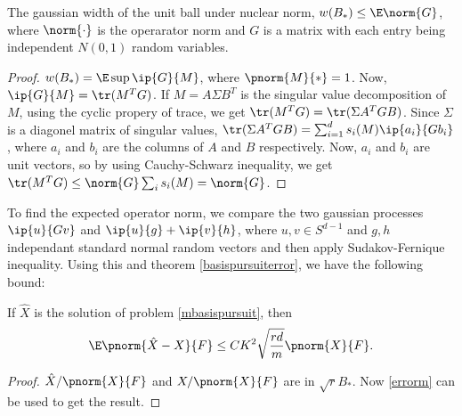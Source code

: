 \begin{proposition}
	The gaussian width of the unit ball under nuclear norm,
	$w(B_*) \leq \E \norm{G}$, where $\norm{\cdot}$ is the operarator norm
	and $G$ is a matrix with each entry being independent $N(0, 1)$
	random variables.
\end{proposition}
\begin{proof}
	$w(B_*) = \E\sup\ip{G}{M}$, where $\pnorm{M}{*} = 1$.
	Now, $\ip{G}{M} = \tr(M^TG)$. If $M = A\Sigma B^T$ is the
	singular value decomposition of $M$, using the cyclic propery
	of trace, we get $\tr(M^TG) = \tr(\Sigma A^T G B)$. Since
	$\Sigma$ is a diagonel matrix of singular values,
	$\tr(\Sigma A^T G B) = \sum_{i=1}^d s_i(M)\ip{a_i}{Gb_i}$,
	where $a_i$ and $b_i$ are the columns of $A$ and $B$ respectively.
	Now, $a_i$ and $b_i$ are unit vectors, so by using Cauchy-Schwarz
	inequality, we get $\tr(M^TG)\leq \norm{G}\sum_i s_i(M)=
	\norm{G}$.
\end{proof}

To find the expected operator norm, we compare the two
gaussian processes $\ip{u}{Gv}$ and $\ip{u}{g} + \ip{v}{h}$,
where $u, v\in S^{d-1}$ and $g,h$ independant standard normal
random vectors and then apply Sudakov-Fernique inequality\cite{hdp}.
Using this and 
theorem \ref{basispursuiterror}, we have
the following bound:
\begin{theorem}
	If $\hat{X}$ is the solution of problem
	\ref{mbasispursuit}, then
	\begin{equation*}
		\E \pnorm{\hat{X}-X}{F}\leq CK^2\sqrt{\frac{rd}{m}}
		\pnorm{X}{F}.
	\end{equation*}
\end{theorem}

\begin{proof}
	$\hat{X}/\pnorm{X}{F}$ and $X/\pnorm{X}{F}$ are in
	$\sqrt{r}B_*$. Now \eqref{errorm} can be used to
	get the result.
\end{proof}
